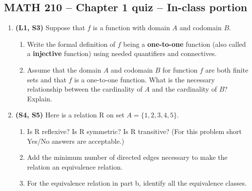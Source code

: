 \documentclass[12pt]{article}
\begin{document}
\pagestyle{empty}
\begin{center}
\section*{MATH 210 -- Chapter 1 quiz -- In-class portion}
\end{center}

\begin{enumerate}


\item 
\textbf{(L1, S3)} Suppose that $f$ is a function with domain $A$ and codomain $B$.

\begin{enumerate}
	\item
	Write the formal definition of $f$ being a \textbf{one-to-one} function (also called a \textbf{injective} function) using needed quantifiers and connectives.

	\item
	Assume that the domain $A$ and codomain $B$ for function $f$ are both finite sets and that $f$ is a one-to-one function. What is the necessary relationship between the cardinality of $A$ and the cardinality of $B$?  Explain.
	
\end{enumerate}


\item \textbf{(S4, S5)} Here is a relation R on set $A=\{1,2,3,4,5\}$.

  \hfill

\begin{enumerate}
    \item Is R reflexive? Is R symmetric? Is R transitive? (For this problem short Yes/No answers are acceptable.) 
    \item Add the minimum number of directed edges necessary to make the relation an equivalence relation.
    \item For the equivalence relation in part b, identify all the equivalence classes. 
\end{enumerate}


\end{enumerate}
\end{document}

